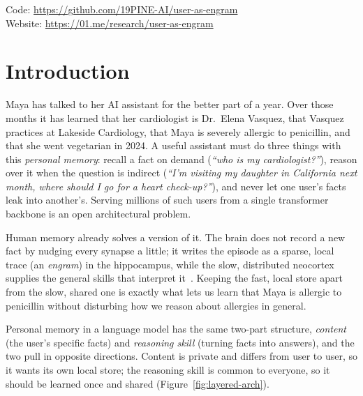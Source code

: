 \documentclass[11pt]{article}
\begin{document}
\begin{center}
\small
Code: \url{https://github.com/19PINE-AI/user-as-engram} \\[2pt]
Website: \url{https://01.me/research/user-as-engram}
\end{center}
\vspace{-0.4em}

\section{Introduction}
\label{sec:intro}

Maya has talked to her AI assistant for the better part of a
year. Over those months it has learned that her cardiologist is
Dr.~Elena Vasquez, that Vasquez practices at Lakeside
Cardiology, that Maya is severely allergic to penicillin, and
that she went vegetarian in 2024. A useful assistant must do
three things with this \emph{personal memory}: recall a fact on
demand (\emph{``who is my cardiologist?''}), reason over it when
the question is indirect (\emph{``I'm visiting my daughter in
California next month, where should I go for a heart
check-up?''}), and never let one user's facts leak into
another's. Serving millions of such users from a single
transformer~\citep{vaswani2017transformer} backbone is an open
architectural problem.

Human memory already solves a version of it. The brain does not
record a new fact by nudging every synapse a little; it writes
the episode as a sparse, local trace (an \emph{engram}) in the
hippocampus, while the slow, distributed neocortex supplies the
general skills that interpret
it~\citep{semon1921mneme,tonegawa2015engram,mcclelland1995cls}.
Keeping the fast, local store apart from the slow, shared one is
exactly what lets us learn that Maya is allergic to penicillin
without disturbing how we reason about allergies in general.

Personal memory in a language model has the same two-part structure,
\emph{content} (the user's specific facts) and \emph{reasoning skill}
(turning facts into answers), and the two pull in opposite directions.
Content is private and differs from user to user, so it wants its own
local store; the reasoning skill is common to everyone, so it should
be learned once and shared (Figure~\ref{fig:layered-arch}).
\end{document}
